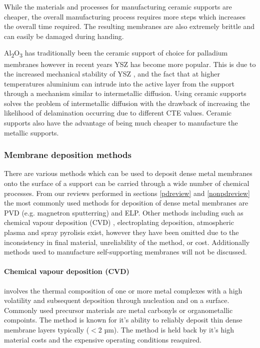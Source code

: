 While the materials and processes for manufacturing ceramic supports are cheaper, the overall manufacturing process requires more steps which increases the overall time required. The resulting membranes are also extremely brittle and can easily be damaged during handing. 

Al\textsubscript{2}O\textsubscript{3} has traditionally been the ceramic support of choice for palladium membranes however in recent years YSZ has become more popular. This is due to the increased mechanical stability of YSZ \cite{Hayashi2005}, and the fact that at higher temperatures aluminium can intrude into the active layer from the support through a mechanism similar to intermetallic diffusion.\cite{Atsonios2015} Using ceramic supports solves the problem of intermetallic diffusion with the drawback of increasing the likelihood of delamination occurring due to different CTE values. Ceramic supports also have the advantage of being much cheaper to manufacture the metallic supports. \cite{Atsonios2015}

\subsubsection{Membrane deposition methods}
There are various methods which can be used to deposit dense metal membranes onto the surface of a support can be carried through a wide number of chemical processes. From our reviews performed in sections \ref{pdreview} and \ref{nonpdreview} the most commonly used methods for deposition of dense metal membranes are PVD (e.g. magnetron sputterring) and ELP. Other methods including such as chemical vapour deposition (CVD) \cite{Yun2011a, Wang2006a, David2011a}, electroplating deposition, atmospheric plasma \cite{HUANG2007160} and spray pyrolisis \cite{LI1993247} exist, however they have been omitted due to the inconsistency in final material, unreliability of the method, or cost. Additionally methods used to manufacture self-supporting membranes will not be discussed.

\paragraph*{Chemical vapour deposition (CVD)} involves the thermal composition of one or more metal complexes with a high volatility and subsequent deposition through nucleation and on a surface. Commonly used precursor materials are metal carbonyls or organometallic compoints. The method is known for it's ability to reliably deposit thin dense membrane layers typically ($<$2 µm). The method is held back by it's high material costs and the expensive operating conditions reaquired.\cite{Yun2011a, Basile2008} 


